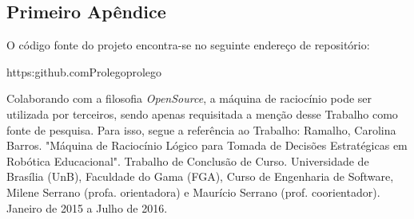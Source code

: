\begin{apendicesenv}

\partapendices

\chapter{Primeiro Apêndice}

O código fonte do projeto encontra-se no seguinte endereço de repositório:

https:\/\/github.com\/Prolego\/prolego

Colaborando com a filosofia \textit{OpenSource}, a máquina de raciocínio pode ser utilizada por terceiros, sendo apenas requisitada a menção desse Trabalho como fonte de pesquisa.
Para isso, segue a referência ao Trabalho:
Ramalho, Carolina Barros. "Máquina de Raciocínio Lógico para Tomada de Decisões Estratégicas em Robótica Educacional". Trabalho de Conclusão de Curso. Universidade de Brasília (UnB), Faculdade do Gama (FGA), Curso de Engenharia de Software, Milene Serrano (profa. orientadora) e Maurício Serrano (prof. coorientador). Janeiro de 2015 a Julho de 2016.

\end{apendicesenv}
